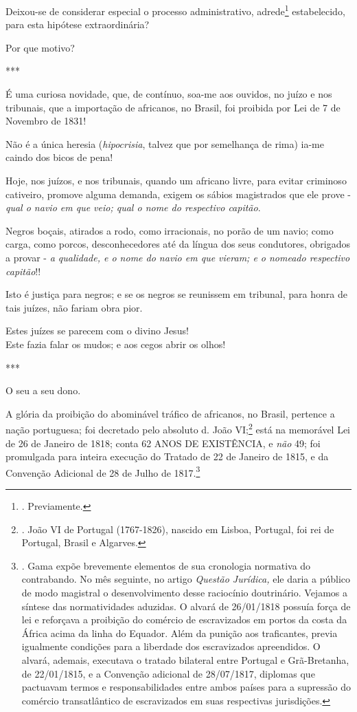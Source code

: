 Deixou-se de considerar especial o processo administrativo,
adrede\footnote{. Previamente.} estabelecido, para esta hipótese
extraordinária?

Por que motivo?

***

É uma curiosa novidade, que, de contínuo, soa-me aos ouvidos, no juízo e
nos tribunais, que a importação de africanos, no Brasil, foi proibida
por Lei de 7 de Novembro de 1831!

Não é a única heresia (\emph{hipocrisia}, talvez que por semelhança de
rima) ia-me caindo dos bicos de pena!

Hoje, nos juízos, e nos tribunais, quando um africano livre, para evitar
criminoso cativeiro, promove alguma demanda, exigem os sábios
magistrados que ele prove - \emph{qual o navio em que veio; qual o nome
do respectivo capitão}.

Negros boçais, atirados a rodo, como irracionais, no porão de um navio;
como carga, como porcos, desconhecedores até da língua dos seus
condutores, obrigados a provar - \emph{a qualidade, e o nome do navio em
que vieram; e o nomeado respectivo capitão}!!

Isto é justiça para negros; e se os negros se reunissem em tribunal,
para honra de tais juízes, não fariam obra pior.

Estes juízes se parecem com o divino Jesus!\\
Este fazia falar os mudos; e aos cegos abrir os olhos!

***

O seu a seu dono.

A glória da proibição do abominável tráfico de africanos, no Brasil,
pertence a nação portuguesa; foi decretado pelo absoluto d. João
VI;\footnote{. João VI de Portugal (1767-1826), nascido em Lisboa,
  Portugal, foi rei de Portugal, Brasil e Algarves.} está na memorável
Lei de 26 de Janeiro de 1818; conta 62 ANOS DE EXISTÊNCIA, e \emph{não}
49; foi promulgada para inteira execução do Tratado de 22 de Janeiro de
1815, e da Convenção Adicional de 28 de Julho de 1817.\footnote{. Gama
  expõe brevemente elementos de sua cronologia normativa do contrabando.
  No mês seguinte, no artigo \emph{Questão Jurídica,} ele daria a
  público de modo magistral o desenvolvimento desse raciocínio
  doutrinário. Vejamos a síntese das normatividades aduzidas. O alvará
  de 26/01/1818 possuía força de lei e reforçava a proibição do comércio
  de escravizados em portos da costa da África acima da linha do
  Equador. Além da punição aos traficantes, previa igualmente condições
  para a liberdade dos escravizados apreendidos. O alvará, ademais,
  executava o tratado bilateral entre Portugal e Grã-Bretanha, de
  22/01/1815, e a Convenção adicional de 28/07/1817, diplomas que
  pactuavam termos e responsabilidades entre ambos países para a
  supressão do comércio transatlântico de escravizados em suas
  respectivas jurisdições.}


